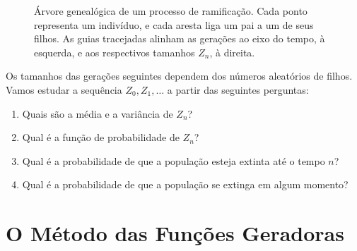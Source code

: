 \documentclass[12pt,portuguese]{article}
\theoremstyle{definition}
\theoremstyle{plainexercise}
\theoremstyle{starredexercise}
\theoremstyle{definition}
\begin{document}
\begin{figure}[htbp]
  \centering
  \caption{Árvore genealógica de um processo de ramificação. Cada ponto
    representa um indivíduo, e cada aresta liga um pai a um de seus filhos.
    As guias tracejadas alinham as gerações ao eixo do tempo, à esquerda,
    e aos respectivos tamanhos $Z_n$, à direita.}
  \label{fig:arvore-ramificacao}
\end{figure}

Os tamanhos das gerações seguintes dependem dos números aleatórios de
filhos. Vamos estudar a sequência $Z_0,Z_1,\ldots$ a partir das seguintes
perguntas:
\begin{enumerate}[label=(\alph*),beginpenalty=10000]
  \item Quais são a média e a variância de $Z_n$?
  \item Qual é a função de probabilidade de $Z_n$?
  \item Qual é a probabilidade de que a população esteja extinta até o
        tempo $n$?
  \item Qual é a probabilidade de que a população se extinga em algum
        momento?
\end{enumerate}

\section{O Método das Funções Geradoras}\label{sec:metodo-geradoras}
\end{document}
